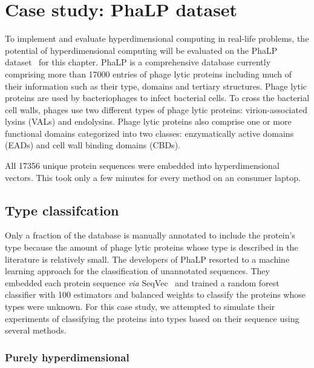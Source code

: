 \section{Case study: PhaLP dataset}
To implement and evaluate hyperdimensional computing in real-life problems, the potential of hyperdimensional computing will be evaluated on the PhaLP dataset~\cite{phalp} for this chapter. PhaLP is a comprehensive database currently comprising more than 17000 entries of phage lytic proteins including much of their information such as their type, domains and tertiary structures. Phage lytic proteins are used by bacteriophages to infect bacterial cells. To cross the bacterial cell walls, phages use two different types of phage lytic proteins: virion-associated lysins (VALs) and endolysins. Phage lytic proteins also comprise one or more functional domains categorized into two classes: enzymatically active domains (EADs) and cell wall binding domains (CBDs).

All 17356 unique protein sequences were embedded into hyperdimensional vectors. This took only a few minutes for every method on an consumer laptop.

\subsection*{Type classifcation}
Only a fraction of the database is manually annotated to include the protein's type because the amount of phage lytic proteins whose type is described in the literature is relatively small. The developers of PhaLP resorted to a machine learning approach for the classification of unannotated sequences. They embedded each protein sequence \textit{via} SeqVec~\cite{seqvec} and trained a random forest classifier with 100 estimators and balanced weights to classify the proteins whose types were unknown. For this case study, we attempted to simulate their experiments of classifying the proteins into types based on their sequence using several methods.
\subsubsection*{Purely hyperdimensional}

\begin{table}[h]
    \caption{\label{tab:phalpclass}Results of type classifications using the principal classification technique of hyperdimensional computing and an XGBoost classifier with several kinds of embeddings}
\end{table}

